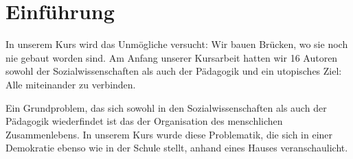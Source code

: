 \section{Einführung}

In unserem Kurs wird das Unmögliche versucht:
Wir bauen Brücken, wo sie noch nie gebaut worden sind.
Am Anfang unserer Kursarbeit hatten wir 16 Autoren sowohl der Sozialwissenschaften als auch der Pädagogik und ein utopisches Ziel:
Alle miteinander zu verbinden.

Ein Grundproblem, das sich sowohl in den Sozialwissenschaften als auch der Pädagogik wiederfindet ist das der Organisation des menschlichen Zusammenlebens.
In unserem Kurs wurde diese Problematik, die sich in einer Demokratie ebenso wie in der Schule stellt, anhand eines Hauses veranschaulicht.

